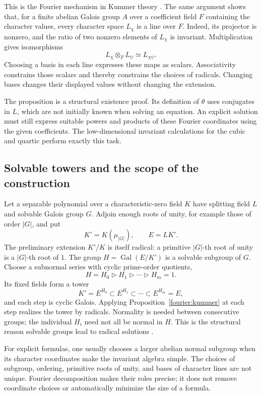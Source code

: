 \documentclass[11pt]{article}
\theoremstyle{remark}
\begin{document}
This is the Fourier mechanism in Kummer theory \cite{milne,stacks-kummer}. The same argument shows that, for a finite abelian Galois group \(A\) over a coefficient field \(F\) containing the character values, every character space \(L_\chi\) is a line over \(F\). Indeed, its projector is nonzero, and the ratio of two nonzero elements of \(L_\chi\) is invariant. Multiplication gives isomorphisms
\[
L_\chi\otimes_F L_\psi\simeq L_{\chi\psi}.
\]
Choosing a basis in each line expresses these maps as scalars. Associativity constrains those scalars and thereby constrains the choices of radicals. Changing bases changes their displayed values without changing the extension.

The proposition is a structural existence proof. Its definition of \(\theta\) uses conjugates in \(L\), which are not initially known when solving an equation. An explicit solution must still express suitable powers and products of these Fourier coordinates using the given coefficients. The low-dimensional invariant calculations for the cubic and quartic perform exactly this task.

\subsection{Solvable towers and the scope of the construction}

Let a separable polynomial over a characteristic-zero field \(K\) have splitting field \(L\) and solvable Galois group \(G\). Adjoin enough roots of unity, for example those of order \(|G|\), and put
\[
K'=K(\mu_{|G|}),\qquad E=LK'.
\]
The preliminary extension \(K'/K\) is itself radical: a primitive \(|G|\)-th root of unity is a \(|G|\)-th root of \(1\). The group \(H=\operatorname{Gal}(E/K')\) is a solvable subgroup of \(G\). Choose a subnormal series with cyclic prime-order quotients,
\[
H=H_0\triangleright H_1\triangleright\cdots\triangleright H_m=1.
\]
Its fixed fields form a tower
\[
K'=E^{H_0}\subset E^{H_1}\subset\cdots\subset E^{H_m}=E,
\]
and each step is cyclic Galois. Applying Proposition~\ref{fourier:kummer} at each step realizes the tower by radicals. Normality is needed between consecutive groups; the individual \(H_i\) need not all be normal in \(H\). This is the structural reason solvable groups lead to radical solutions \cite{milne}.

For explicit formulas, one usually chooses a larger abelian normal subgroup when its character coordinates make the invariant algebra simple. The choices of subgroup, ordering, primitive roots of unity, and bases of character lines are not unique. Fourier decomposition makes their roles precise; it does not remove coordinate choices or automatically minimize the size of a formula.
\end{document}
